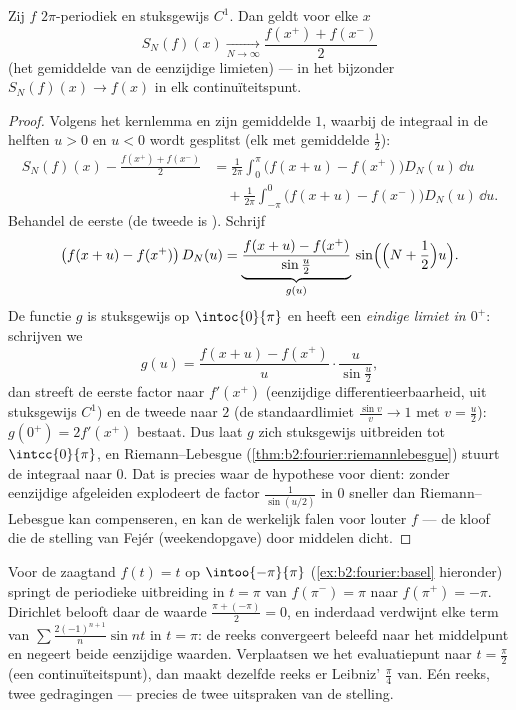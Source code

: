 \begin{theorem}[Dirichlet]\label{thm:b2:fourier:dirichlet}
Zij $f$ $2\pi$-periodiek en stuksgewijs $C^1$. Dan geldt voor elke
$x$
\[
S_N(f)(x) \xrightarrow[N \to \infty]{}
\frac{f(x^+) + f(x^-)}{2}
\]
(het gemiddelde van de eenzijdige limieten) --- in het bijzonder
$S_N(f)(x) \to f(x)$ in elk continuïteitspunt.
\end{theorem}


\begin{proof}
Volgens het kernlemma en zijn gemiddelde $1$, waarbij de integraal
in de helften $u > 0$ en $u < 0$ wordt gesplitst (elk met
gemiddelde $\frac12$):
\begin{align*}
S_N(f)(x) - \frac{f(x^+) + f(x^-)}{2}
&= \frac{1}{2\pi}\int_{0}^{\pi} \bigl(f(x+u) -
f(x^+)\bigr)D_N(u)\,\dd u\\
&\quad+ \frac{1}{2\pi}\int_{-\pi}^{0}\bigl(f(x+u) -
f(x^-)\bigr)D_N(u)\,\dd u .
\end{align*}
Behandel de eerste (de tweede is ). Schrijf
\[
\bigl(f(x + u) - f(x^+)\bigr)\,D_N(u)
= \underbrace{\frac{f(x+u) - f(x^+)}{\sin\frac u2}}_{g(u)}\,
\sin\Bigl(\Bigl(N + \frac12\Bigr)u\Bigr) .
\]
De functie $g$ is stuksgewijs  op $\intoc{0}{\pi}$ en heeft
een \emph{eindige limiet in $0^+$}: schrijven we
\[
g(u) = \frac{f(x+u) - f(x^+)}{u}\cdot\frac{u}{\sin\frac u2} ,
\]
dan streeft de eerste factor naar $f'(x^+)$ (eenzijdige
differentieerbaarheid, uit stuksgewijs $C^1$) en de tweede naar $2$
(de standaardlimiet $\frac{\sin v}{v} \to 1$ met $v = \frac u2$):
$g(0^+) = 2f'(x^+)$ bestaat. Dus laat $g$ zich stuksgewijs 
uitbreiden tot $\intcc{0}{\pi}$, en Riemann--Lebesgue
(\cref{thm:b2:fourier:riemannlebesgue}) stuurt de integraal naar
$0$. Dat is precies waar de hypothese voor dient: zonder
eenzijdige afgeleiden explodeert de factor $\frac{1}{\sin(u/2)}$ in
$0$ sneller dan Riemann--Lebesgue kan compenseren, en kan de
 werkelijk falen voor louter  $f$
--- de kloof die de stelling van Fejér (weekendopgave) door
middelen dicht.
\end{proof}

\begin{example}\label{ex:b2:fourier:jumpvalue}
Voor de zaagtand $f(t) = t$ op $\intoo{-\pi}{\pi}$
(\cref{ex:b2:fourier:basel} hieronder) springt de periodieke
uitbreiding in $t = \pi$ van $f(\pi^-) = \pi$ naar $f(\pi^+) =
-\pi$. Dirichlet belooft daar de waarde $\frac{\pi + (-\pi)}{2} =
0$, en inderdaad verdwijnt elke term van $\sum
\frac{2(-1)^{n+1}}{n}\sin nt$ in $t = \pi$: de reeks convergeert
beleefd naar het middelpunt en negeert beide eenzijdige waarden.
Verplaatsen we het evaluatiepunt naar $t = \frac\pi2$ (een
continuïteitspunt), dan maakt dezelfde reeks er Leibniz'
$\frac\pi4$ van. Eén reeks, twee gedragingen --- precies de twee
uitspraken van de stelling.
\end{example}

